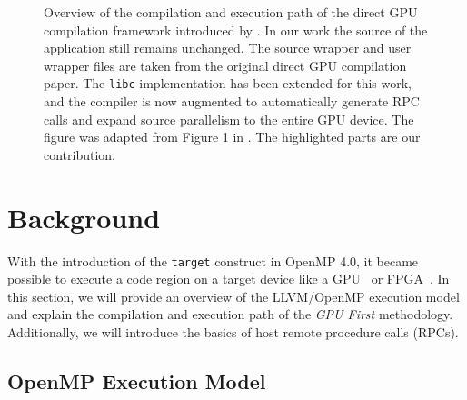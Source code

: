 \begin{figure}[b]
\vspace*{-3mm}
\resizebox{.9\linewidth}{!}{

}
\vspace*{-3mm}
\caption{Overview of the compilation and execution path of the direct GPU compilation framework introduced by \citet{DBLP:conf/llvmhpc/TianHPCD22}.
In our work the source of the application still remains unchanged.
The source wrapper and user wrapper files are taken from the original direct GPU compilation paper.
The \texttt{libc} implementation has been extended for this work, and the compiler is now augmented to automatically generate RPC calls and expand source parallelism to the entire GPU device.
The figure was adapted from Figure 1 in \citet{DBLP:conf/iwomp/TianHTCD22}.
The highlighted parts are our contribution.}
\label{fig:compilation_execution_path}
\end{figure}

\section{Background}
\label{sec:background}

With the introduction of the \lstinline{target} construct in OpenMP 4.0, it became possible to execute a code region on a target device like a GPU~\cite{DBLP:conf/sc/BertolliAEOSJCS14} or FPGA~\cite{DBLP:conf/iwomp/MayerKP19}.
In this section, we will provide an overview of the LLVM/OpenMP execution model and explain the compilation and execution path of the \emph{GPU First} methodology. 
Additionally, we will introduce the basics of host remote procedure calls (RPCs).

\subsection{OpenMP Execution Model}\label{sec:execution-model}

